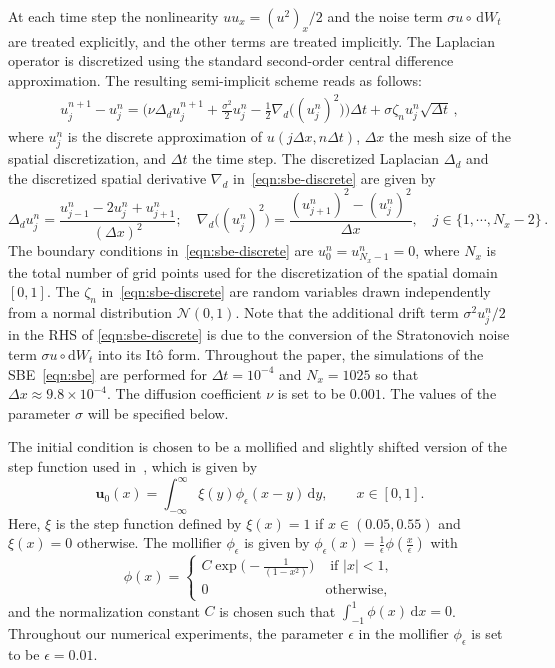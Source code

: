 \documentclass[11pt]{amsart}
\numberwithin{equation}{section}
\def\d{\, \mathrm{d}}
\def\bes{\begin{equation*}}
\def\ees{\end{equation*}}
\newcommand{\bu}{\boldsymbol{u}}
\begin{document}
At each time step the nonlinearity $uu_x = (u^2)_x/2$ and the noise term $\sigma u \circ \d W_t$ are treated explicitly, and the other terms are treated implicitly. 
The Laplacian operator is discretized using the standard second-order central difference approximation. The resulting semi-implicit scheme reads as follows:
\begin{eqnarray}  
u_{j}^{n+1} - u_{j}^{n} = 
 \Big( \nu \Delta_d u_{j}^{n+1} + \frac{\sigma^2}{2}u_{j}^{n} - \frac{1}{2} \nabla_d\big((u_{j}^{n})^2 \bigr)\Big)\Delta t  + \sigma \zeta_n   u_{j}^{n} \sqrt{\Delta t} \, ,
	\label{eqn:sbe-discrete}
\end{eqnarray} 
where $u_{j}^{n}$ is the discrete approximation of $u(j\Delta x, n \Delta t)$, $\Delta x$ the mesh size of the spatial discretization, and $\Delta t$ the time step.  
The discretized Laplacian $\Delta_d$  and the discretized spatial derivative $\nabla_d$   in~\eqref{eqn:sbe-discrete} are given by
\begin{equation*}  
\Delta_d u_{j}^{n}= \frac{u_{j-1}^{n} - 2u_{j}^{n} + u_{j+1}^{n}}{(\Delta x)^2}; \quad \nabla_d \big( (u_j^{n})^2\big) = \frac{ (u_{j+1}^{n})^2 - (u_j^{n})^2 }{\Delta x}, \quad j \in \{1, \cdots, N_x - 2\} \, .
\end{equation*}  
The boundary conditions in~\eqref{eqn:sbe-discrete} are $u_0^n=u^n_{N_x-1}=0$, where $N_x$ is the total number of grid points used for the discretization of the spatial domain $[0, 1]$.
The $\zeta_n$ in~\eqref{eqn:sbe-discrete} are random variables drawn independently from a normal distribution $\mathcal{N}(0,1)$. 
Note that the additional drift term $\sigma^2 u_{j}^{n}/2$ in the RHS of \eqref{eqn:sbe-discrete} is due to the conversion of the Stratonovich noise term $\sigma u\circ \mathrm{d}W_t$ into its  It\^o form. 
Throughout the paper, the simulations of the SBE~\eqref{eqn:sbe} are performed for $\Delta t=10^{-4}$ and $N_x = 1025$ so that $\Delta x \approx 9.8\times 10^{-4}$. 
The diffusion coefficient $\nu$ is set to be $0.001$. The values of the parameter $\sigma$ will be specified below.

\medskip
{}  The initial condition is chosen to be a mollified and slightly shifted version of the step function used in~\cite{KV99}, which is given by 
\begin{equation} 
	\bu_0(x) = \int_{-\infty}^{\infty} \xi(y) \phi_{\epsilon}(x-y) \d y,  \qquad x \in [0,1].
	\label{eqn:initial-condition}
\end{equation}
Here, $\xi$ is the step function defined by $\xi(x) =1$ if $x\in (0.05, 0.55)$ and $\xi(x) = 0$ otherwise. The mollifier $\phi_{\epsilon}$ is given by $\phi_{\epsilon}(x) = \frac{1}{\epsilon}\phi(\frac{x}{\epsilon})$ with 
\bes
\phi(x) = \begin{cases}
C \exp\big(-\frac{1}{(1-x^2)}\big) & \text{ if $|x| < 1$}, \\
 0 & \text{otherwise}, 
 \end{cases}
\ees
and the normalization constant $C$ is chosen such that $\int_{-1}^1 \phi(x) \d x = 0$. Throughout our numerical experiments, the parameter $\epsilon$ in the mollifier $\phi_{\epsilon}$ is set to be $\epsilon = 0.01$.
\end{document}
